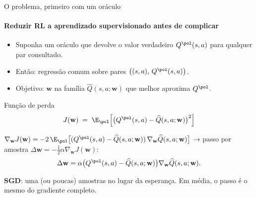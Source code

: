 \documentclass[aspectratio=169, 11pt]{beamer}
\newcommand{\Qhat}{\widehat{Q}}
\newcommand{\wv}{\mathbf{w}}
\begin{document}
\begin{frame}{O problema, primeiro com um oráculo}
  \framesubtitle{Reduzir RL a aprendizado supervisionado antes de complicar}

  \begin{itemize}\setlength{\itemsep}{0.35ex}
    \item Suponha um oráculo que devolve o valor verdadeiro $Q^{\pol}(s,a)$
      para qualquer par consultado.
    \item Então: regressão comum sobre pares
      $\bigl((s,a),\, Q^{\pol}(s,a)\bigr)$.
    \item Objetivo: $\wv$ na família $\Qhat(s,a;\wv)$ que melhor aproxima
      $Q^{\pol}$.
  \end{itemize}

  \vspace{-0.7em}
  \begin{defbox}{Função de perda}
    \[ J(\wv) \;=\; \E_{\pol}\Bigl[\bigl(Q^{\pol}(s,a) - \Qhat(s,a;\wv)\bigr)^2\Bigr] \]
  \end{defbox}

  \vspace{-0.7em}
  {\small $\nabla_{\wv} J(\wv) = -2\,\E_{\pol}\bigl[(Q^{\pol}(s,a) - \Qhat(s,a;\wv))\,\nabla_{\wv}\Qhat(s,a;\wv)\bigr]$
  → passo por amostra $\Delta \wv = -\tfrac{1}{2}\alpha \nabla_{\wv} J(\wv)$:}
  \vspace{-0.6em}
  \[ \Delta \wv = \alpha\bigl(Q^{\pol}(s,a) - \Qhat(s,a;\wv)\bigr)\nabla_{\wv}\Qhat(s,a;\wv). \]
  \vspace{-1.3em}

  {\small \textbf{SGD}: uma (ou poucas) amostras no lugar da esperança. Em
  média, o passo é o mesmo do gradiente completo.}
\end{frame}
\end{document}
